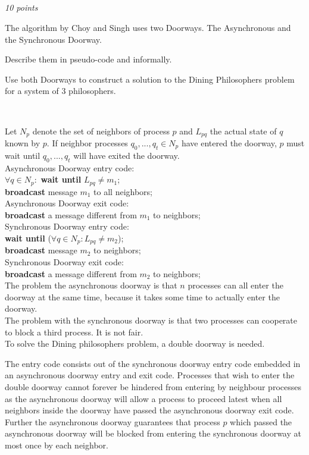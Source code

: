 \documentclass[a4paper]{article}
\newcommand{\points}[1]{\subsection{} \textit{#1 points}\\}
\newcommand{\question}[2][]{
  \parbox[t]{\textwidth}{
    \ifthenelse{\equal{#1}{}}{}{#1)}
    \parbox[t]{0.95\textwidth}{#2}}\\}
\newcommand{\solution}[2][]{
  \ifthenelse{\equal{#1}{} \or \equal{#1}{a}}{\\[3pt]\textit{Solution: }\\[0.1cm]}{}
  \question[#1]{#2}
}
\begin{document}
\points{10}
\question{
  The algorithm by Choy and Singh uses two Doorways. The Asynchronous
  and the Synchronous Doorway.

  Describe them in pseudo-code and informally.

  Use both Doorways to construct a solution to the Dining
  Philosophers problem for a system of 3 philosophers.
}
\solution{
  Let $N_p$ denote the set of neighbors of process $p$ and $L_{pq}$
  the actual state of $q$ known by $p$. If neighbor processes
  $q_0,...,q_t \in N_p$ have entered the doorway, $p$ must wait until
  $q_0,...,q_t$ will have exited the doorway.\\[0.1cm]

  Asynchronous Doorway entry code:\\
  $\forall q \in N_p:$ \textbf{wait until} $L_{pq} \neq m_1$;\\
  \textbf{broadcast} message $m_1$ to all neighbors;\\[0.1cm]

  Asynchronous Doorway exit code:\\
  \textbf{broadcast} a message different from $m_1$ to neighbors;\\[0.1cm]

  Synchronous Doorway entry code:\\
  \textbf{wait until} ($\forall q \in N_p: L_{pq} \neq m_2$);\\
  \textbf{broadcast} message $m_2$ to neighbors;\\[0.1cm]

  Synchronous Doorway exit code:\\
  \textbf{broadcast} a message different from $m_2$ to neighbors;\\[0.1cm]

  The problem the asynchronous doorway is that $n$ processes can all
  enter the doorway at the same time, because it takes some time to
  actually enter the doorway.\\[0.1cm]

  The problem with the synchronous doorway is that two processes can
  cooperate to block a third process. It is not fair.\\[0.1cm]

  To solve the Dining philosophers problem, a double doorway is
  needed.

  The entry code consists out of the synchronous doorway entry code
  embedded in an asynchronous doorway entry and exit code. Processes
  that wish to enter the double doorway cannot forever be hindered from
  entering by neighbour processes as the asynchronous doorway will allow
  a process to proceed latest when all neighbors inside the doorway
  have passed the asynchronous doorway exit code. Further the
  asynchronous doorway guarantees that process $p$ which passed the
  asynchronous doorway will be blocked from entering the synchronous
  doorway at most once by each neighbor.

}
\end{document}
